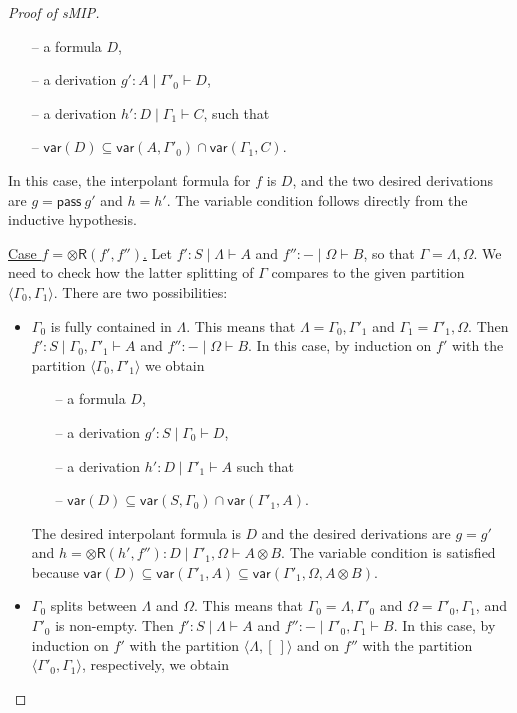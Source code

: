 \documentclass[sn-mathphys-num]{sn-jnl}%
\newcommand{\GG}{\Gamma}
\newcommand{\GL}{\Lambda}
\newcommand{\GO}{\Omega}
\newcommand{\vd}{\vdash}
\newcommand{\tr}{\otimes\mathsf{R}}
\newcommand{\pass}{\mathsf{pass}}
\newcommand{\ot}{\otimes}
\newcommand{\mf}[1]{\mathsf{#1}}
\newcommand{\vars}[1]{\mf{var} (#1)}
\newcommand{\sMIP}{\textsf{sMIP}}
\theoremstyle{thmstyleone}%
\theoremstyle{thmstyletwo}%
\theoremstyle{thmstylethree}%
\begin{document}
\begin{proof}[Proof of \sMIP]
\begin{itemize}
\begin{itemize}
      \item[--] a formula $D$,
      \item[--] a derivation $g' : A \mid \GG'_0 \vd D$,
      \item[--] a derivation $h' : D \mid \GG_1 \vd C$, such that
      \item[--] $\vars{D} \subseteq \vars{A, \GG'_0} \cap \vars{\GG_1, C}$.
    \end{itemize}
    In this case, the interpolant formula for $f$ is $D$, and the two desired derivations are $g = \pass \ g'$ and $h = h'$.
    The variable condition follows directly from the inductive hypothesis.
  \end{itemize} 
  \underline{Case $f = \tr (f',f'')$.} Let $f' : S \mid \GL \vd A$ and $f'' : {-} \mid \GO \vd B$, so that $\GG = \GL,\GO$. We need to check how the latter splitting of $\GG$ compares to the given partition $\langle \GG_0,\GG_1 \rangle$. 
  There are two possibilities:
  \begin{itemize}
    \item $\GG_0$ is fully contained in $\GL$. 
    This means that $\GL = \GG_0 , \GG'_1$ and $\GG_1 = \GG'_1,\GO$.
    Then $f' : S \mid \GG_0 , \GG'_1 \vd A$ and $f'' : {-} \mid \GO \vd B$.
    In this case, by induction on $f'$ with the partition $\langle \GG_0 , \GG'_1 \rangle$ we obtain
    \begin{itemize}
      \item[--] a formula $D$,
      \item[--] a derivation $g' : S \mid \GG_0 \vd D$, 
      \item[--] a derivation $h' : D \mid \GG'_1 \vd A$ such that 
      \item[--] $\vars{D} \subseteq \vars{S, \GG_0} \cap \vars{\GG'_1 , A}$.
    \end{itemize}
    The desired interpolant formula is $D$ and the desired derivations are $g = g'$ and $h = \tr (h' , f'') : D \mid \GG'_1 , \GO \vd A \ot B$.
    The variable condition is satisfied because $\vars{D} \subseteq \vars{\GG'_1 , A} \subseteq \vars{\GG'_1 , \GO , A \ot B}$.
    \item  $\GG_0$ splits between $\GL$ and $\GO$. 
    This means that $\GG_0 = \GL,\GG'_0$ and $\GO = \GG'_0,\GG_1$, and $\GG'_0$ is non-empty.
    Then $f' : S \mid \GL \vd A$ and $f'': {-} \mid \GG'_0, \GG_1 \vd B$.
    In this case, by induction on $f'$ with the partition $\langle \GL , [\ ] \rangle $ and on $f''$ with the partition $\langle \GG'_0 , \GG_1 \rangle$, respectively, we obtain
    \begin{itemize}

\end{itemize}
\end{itemize}
\end{proof}
\end{document}
